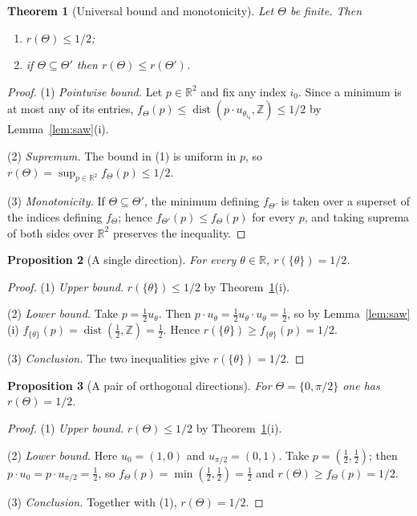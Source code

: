 \documentclass[11pt]{article}
\theoremstyle{plain}
\newtheorem{theorem}{Theorem}[section]
\newtheorem{proposition}[theorem]{Proposition}
\theoremstyle{definition}
\theoremstyle{remark}
\newcommand{\dZ}{\operatorname{dist}}
\newcommand{\R}{\mathbb{R}}
\newcommand{\Z}{\mathbb{Z}}
\begin{document}
\begin{theorem}[Universal bound and monotonicity]
\label{prop:univ}
Let $\Theta$ be finite. Then
\begin{enumerate}
\item[(i)] $r(\Theta)\le1/2$;
\item[(ii)] if $\Theta\subseteq\Theta'$ then $r(\Theta)\le r(\Theta')$.
\end{enumerate}
\end{theorem}

\begin{proof}
(1) \emph{Pointwise bound.} Let $p\in\R^2$ and fix any index $i_0$. Since a minimum is at most any of
its entries, $f_\Theta(p)\le\dZ(p\cdot u_{\theta_{i_0}},\Z)\le1/2$ by Lemma~\ref{lem:saw}(i).

(2) \emph{Supremum.} The bound in (1) is uniform in $p$, so
$r(\Theta)=\sup_{p\in\R^2}f_\Theta(p)\le1/2$.

(3) \emph{Monotonicity.} If $\Theta\subseteq\Theta'$, the minimum defining $f_{\Theta'}$ is taken over a
superset of the indices defining $f_\Theta$; hence $f_{\Theta'}(p)\le f_\Theta(p)$ for every $p$, and
taking suprema of both sides over $\R^2$ preserves the inequality.
\end{proof}

\begin{proposition}[A single direction]
\label{prop:k1}
For every $\theta\in\R$, $r(\{\theta\})=1/2$.
\end{proposition}

\begin{proof}
(1) \emph{Upper bound.} $r(\{\theta\})\le1/2$ by Theorem~\ref{prop:univ}(i).

(2) \emph{Lower bound.} Take $p=\tfrac12u_\theta$. Then
$p\cdot u_\theta=\tfrac12u_\theta\cdot u_\theta=\tfrac12$, so by Lemma~\ref{lem:saw}(i)
$f_{\{\theta\}}(p)=\dZ(\tfrac12,\Z)=\tfrac12$. Hence $r(\{\theta\})\ge f_{\{\theta\}}(p)=1/2$.

(3) \emph{Conclusion.} The two inequalities give $r(\{\theta\})=1/2$.
\end{proof}

\begin{proposition}[A pair of orthogonal directions]
\label{prop:orth}
For $\Theta=\{0,\pi/2\}$ one has $r(\Theta)=1/2$.
\end{proposition}

\begin{proof}
(1) \emph{Upper bound.} $r(\Theta)\le1/2$ by Theorem~\ref{prop:univ}(i).

(2) \emph{Lower bound.} Here $u_0=(1,0)$ and $u_{\pi/2}=(0,1)$. Take $p=(\tfrac12,\tfrac12)$; then
$p\cdot u_0=p\cdot u_{\pi/2}=\tfrac12$, so $f_\Theta(p)=\min(\tfrac12,\tfrac12)=\tfrac12$ and
$r(\Theta)\ge f_\Theta(p)=1/2$.

(3) \emph{Conclusion.} Together with (1), $r(\Theta)=1/2$.
\end{proof}
\end{document}
